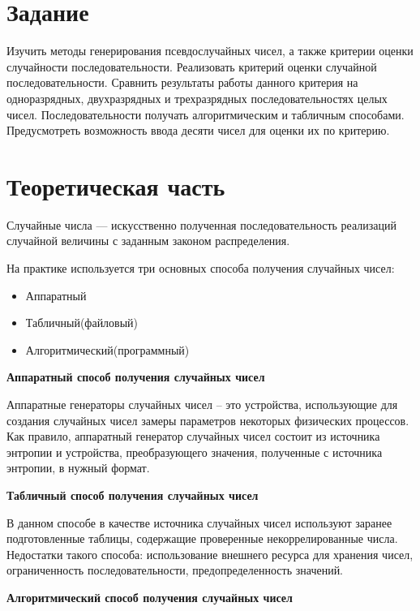 \documentclass[14pt, a4paper]{extarticle}
\begin{document}


\setcounter{page}{2}
\section{Задание}
Изучить методы генерирования псевдослучайных чисел, а также критерии оценки случайности последовательности. Реализовать критерий оценки случайной последовательности. Сравнить результаты работы данного критерия на одноразрядных, двухразрядных и трехразрядных последовательностях целых чисел. Последовательности получать алгоритмическим и табличным способами. Предусмотреть возможность ввода десяти чисел для оценки их по критерию.

\section{Теоретическая часть}
Случайные числа — искусственно полученная последовательность реализаций случайной величины с заданным законом распределения.

На практике используется три основных способа получения случайных чисел:
\begin{itemize}
    \item Аппаратный
    \item Табличный(файловый)
    \item Алгоритмический(программный)
\end{itemize}

\textbf{Аппаратный способ получения случайных чисел}

Аппаратные генераторы случайных чисел – это устройства, использующие для создания случайных чисел замеры параметров некоторых физических процессов. Как правило, аппаратный генератор случайных чисел состоит из источника энтропии и устройства, преобразующего значения, полученные с источника энтропии, в нужный формат.

\textbf{Табличный способ получения случайных чисел}

В данном способе в качестве источника случайных чисел используют заранее подготовленные таблицы, содержащие проверенные некоррелированные числа. Недостатки такого способа: использование внешнего ресурса для хранения чисел, ограниченность последовательности, предопределенность значений.

\textbf{Алгоритмический способ получения случайных чисел}
\end{document}
